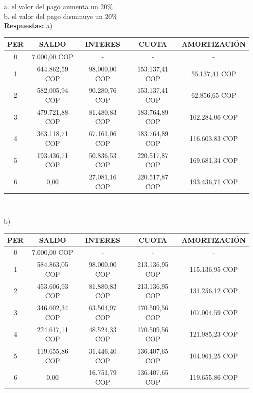 \begin{itemize}
       a.	el valor del pago aumenta un 20\% \\
       b.	el valor del pago disminuye un 20\% \\
       \textbf{Respuestas:}
       a)
       \begin{center}
        \begin{tabular}{| c | c | c | c | c |}\hline
           \textbf{PER} & \textbf{SALDO} & \textbf{INTERES} & \textbf{CUOTA} & \textbf{AMORTIZACIÓN}  \\ \hline
        0 & 7.000,00 COP & - & - & -  \\ \hline
        1 & 644.862,59 COP & 98.000,00 COP & 153.137,41 COP & 55.137,41 COP \\ \hline
        2 & 582.005,94 COP & 90.280,76 COP & 153.137,41 COP & 62.856,65 COP \\ \hline
        3 & 479.721,88 COP & 81.480,83 COP & 183.764,89 COP & 102.284,06 COP \\ \hline
        4 & 363.118,71 COP & 67.161,06 COP & 183.764,89 COP & 116.603,83 COP \\ \hline
        5 & 193.436,71 COP & 50.836,53 COP & 220.517,87 COP & 169.681,34 COP \\ \hline
        6 & 0,00 & 27.081,16 COP & 220.517,87 COP & 193.436,71 COP \\ \hline
        \end{tabular}\\
        \end{center}
       b)
      \begin{center}
        \begin{tabular}{| c | c | c | c | c |}\hline
           \textbf{PER} & \textbf{SALDO} & \textbf{INTERES} & \textbf{CUOTA} & \textbf{AMORTIZACIÓN}  \\ \hline
        0 & 7.000,00 COP & - & - & -  \\ \hline
        1 & 584.863,05 COP & 98.000,00 COP & 213.136,95 COP & 115.136,95 COP \\ \hline
        2 & 453.606,93 COP & 81.880,83 COP & 213.136,95 COP & 131.256,12 COP \\ \hline
        3 & 346.602,34 COP & 63.504,97 COP & 170.509,56 COP & 107.004,59 COP \\ \hline
        4 & 224.617,11 COP & 48.524,33 COP & 170.509,56 COP & 121.985,23 COP \\ \hline
        5 & 119.655,86 COP & 31.446,40 COP & 136.407,65 COP & 104.961,25 COP \\ \hline
        6 & 0,00 & 16.751,79 COP & 136.407,65 COP & 119.655,86 COP \\ \hline
        \end{tabular}\\
        \end{center}


\end{itemize}
